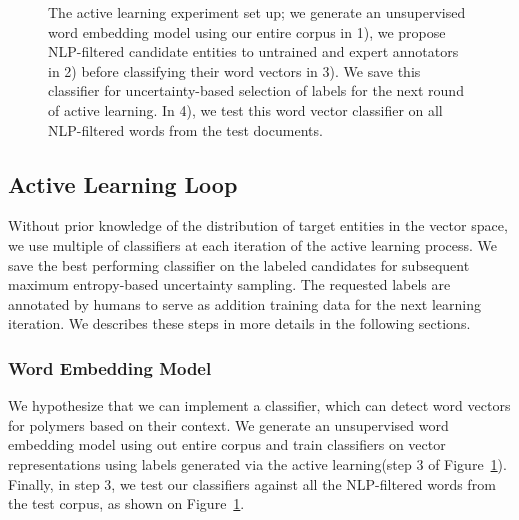 \begin{figure}[!t]
\centering
{}
\caption{\label{fig:current} The active learning experiment set up; we generate an unsupervised word embedding model using our entire corpus in 1), we propose NLP-filtered candidate entities to untrained and expert annotators in 2) before classifying their word vectors in 3). We save this classifier for uncertainty-based selection of labels for the next round of active learning. In 4), we test this word vector classifier on all NLP-filtered words from the test documents.}
\end{figure}

\subsection{Active Learning Loop}
Without prior knowledge of the distribution of target entities in the vector space, we use multiple of classifiers at each iteration of the active learning process. 
We save the best performing classifier on the labeled candidates for subsequent maximum entropy-based uncertainty sampling. 
The requested labels are annotated by humans to serve as addition training data for the next learning iteration. 
We describes these steps in more details in the following sections.

\subsubsection{Word Embedding Model}
We hypothesize that we can implement a classifier, which can detect word vectors for polymers based on their context. 
We generate an unsupervised word embedding model using out entire corpus and train classifiers on vector representations using labels generated via the active learning(step 3 of Figure~\ref{fig:current}).
Finally, in step 3, we test our classifiers against all the NLP-filtered words from the test corpus, as shown on Figure~\ref{fig:current}.

